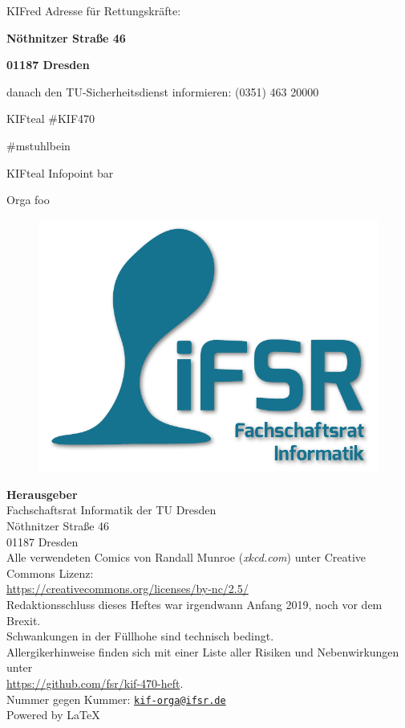 \begin{awesomeblock}[KIFred]{2pt}{\faFire}{KIFred}
    Adresse für Rettungskräfte:

    \begin{center}
      \textbf{Nöthnitzer Straße 46}

      \textbf{01187 Dresden}
    \end{center}

   danach den TU-Sicherheitsdienst informieren:
   (0351) 463 20000
\end{awesomeblock}

\begin{awesomeblock}[KIFteal]{2pt}{\faTwitter}{KIFteal}
  \#KIF470

  \#mstuhlbein
\end{awesomeblock}

\begin{awesomeblock}[KIFteal]{2pt}{\faInfoCircle}{KIFteal}
  Infopoint bar

  Orga foo
\end{awesomeblock}

\vfill

\setlength{\parindent}{0cm}

\begin{figure}
  \vspace*{-20pt}
  \includegraphics[width=.4\textwidth]{img/imprint}
\end{figure}

\footnotesize
\textbf{Herausgeber} \\
Fachschaftsrat Informatik der TU Dresden\\
Nöthnitzer Straße 46\\
01187 Dresden\\[1\baselineskip]

Alle verwendeten Comics von Randall Munroe (\textit{xkcd.com}) unter Creative Commons Lizenz:\\
\url{https://creativecommons.org/licenses/by-nc/2.5/}\\[1\baselineskip]

Redaktionsschluss dieses Heftes war irgendwann Anfang 2019, noch vor dem Brexit.\\%
Schwankungen in der Füllhohe sind technisch bedingt.\\[1\baselineskip]

Allergikerhinweise finden sich mit einer Liste aller Risiken und Nebenwirkungen unter\\
\url{https://github.com/fsr/kif-470-heft}.\\[1\baselineskip]

Nummer gegen Kummer: \href{mailto:kif-orga@ifsr.de}{\texttt{kif-orga@ifsr.de}}\\[1\baselineskip]

Powered by \LaTeX%
